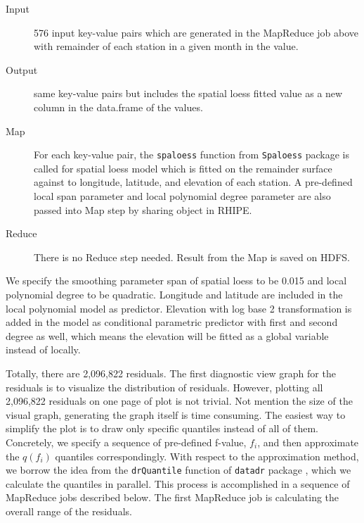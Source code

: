 \begin{description}
  \item[Input] 576 input key-value pairs which are generated in the MapReduce job
  above with remainder of each station in a given month in the value.
  \item[Output] same key-value pairs but includes the spatial loess fitted value
  as a new column in the data.frame of the values.
  \item[Map] For each key-value pair, the \texttt{spaloess} function from 
  \texttt{Spaloess} package is called for spatial loess model which is fitted on
  the remainder surface against to longitude, latitude, and elevation of each 
  station. A pre-defined local span parameter and local polynomial degree 
  parameter are also passed into Map step by sharing object in RHIPE.  
  \item[Reduce] There is no Reduce step needed. Result from the Map is saved on
  HDFS.
\end{description}

We specify the smoothing parameter span of spatial loess to be 0.015 and local
polynomial degree to be quadratic. Longitude and latitude are included in the 
local polynomial model as predictor. Elevation with log base 2 transformation is
added in the model as conditional parametric predictor with first and second 
degree as well, which means the elevation will be fitted as a global variable 
instead of locally. 

Totally, there are 2,096,822 residuals. The first diagnostic view graph for the
residuals is to visualize the distribution of residuals. 
However, plotting all 2,096,822 residuals on one page of plot is not trivial. Not
mention the size of the visual graph, generating the graph itself is time 
consuming. The easiest way to simplify the plot is to draw only specific quantiles
instead of all of them. Concretely, we specify a sequence of pre-defined f-value,
$f_i$, and then approximate the $q(f_i)$ quantiles correspondingly. With respect
to the approximation method, we borrow the idea from the \texttt{drQuantile} 
function of \texttt{datadr} package \cite{datadr}, which we calculate the quantiles
in parallel. This process is accomplished in a sequence of MapReduce jobs described 
below. The first MapReduce job is calculating the overall range of the residuals.

